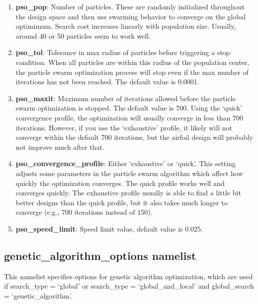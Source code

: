 \documentclass[11pt]{article}
\begin{document}
\begin{enumerate}
\item{\textbf{pso\_pop}: Number of particles.  These are randomly initialized throughout 
the design space and then use swarming behavior to converge on the global optimimum.  
Search cost increases linearly with population size.  Usually, around 40 or 50 particles 
seem to work well.}
\item{\textbf{pso\_tol}: Tolerance in max radius of particles before triggering a stop
condition.  When all particles are within this radius of the population center, the
particle swarm optimization process will stop even if the max number of iterations has
not been reached. The default value is 0.0001.}
\item{\textbf{pso\_maxit}: Maximum number of iterations allowed before the particle swarm
optimization is stopped.  The default value is 700.  Using the 
`quick' convergence profile, the optimization will usually converge in less than 700
iterations. However, if you use the `exhaustive' profile, it likely will not converge
within the default 700 iterations, but the airfoil design will probably not improve much 
after that.}
\item{\textbf{pso\_convergence\_profile}: Either `exhaustive' or `quick'.  This setting
adjusts some parameters in the particle swarm algorithm which affect how quickly the
optimization converges.  The quick profile works well and converges quickly.  The
exhaustive profile usually is able to find a little bit better designs than the quick
profile, but it also takes much longer to converge (e.g., 700 iterations instead of 150).}
\item{\textbf{pso\_speed\_limit}: Speed limit value, default value is 0.025.}
\end{enumerate}

\subsection{genetic\_algorithm\_options namelist}

This namelist specifies options for genetic algorithm optimization, which are used if
search\_type = `global' or search\_type = `global\_and\_local' and global\_search =
`genetic\_algorithm'.
\end{document}
